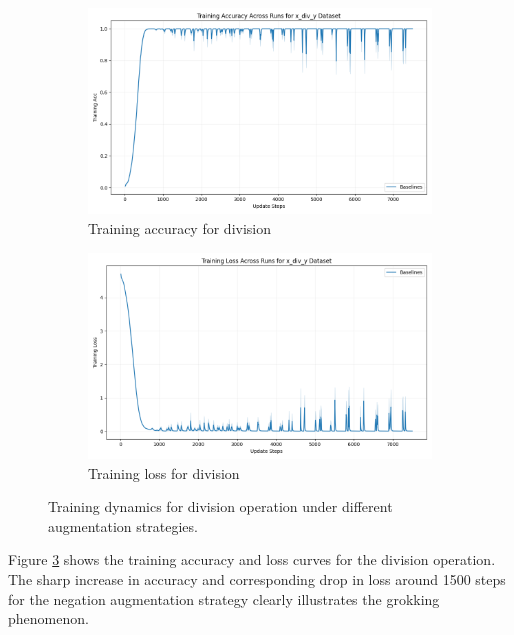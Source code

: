 \documentclass{article} %
\begin{document}
\begin{figure}[h]
    \centering
    \begin{subfigure}{0.49\textwidth}
        \includegraphics[width=\textwidth]{train_acc_x_div_y.png}
        \caption{Training accuracy for division}
        \label{fig:train_acc_div}
    \end{subfigure}
    \hfill
    \begin{subfigure}{0.49\textwidth}
        \includegraphics[width=\textwidth]{train_loss_x_div_y.png}
        \caption{Training loss for division}
        \label{fig:train_loss_div}
    \end{subfigure}
    \caption{Training dynamics for division operation under different augmentation strategies.}
    \label{fig:train_dynamics_div}
\end{figure}

Figure \ref{fig:train_dynamics_div} shows the training accuracy and loss curves for the division operation. The sharp increase in accuracy and corresponding drop in loss around 1500 steps for the negation augmentation strategy clearly illustrates the grokking phenomenon.
\end{document}
